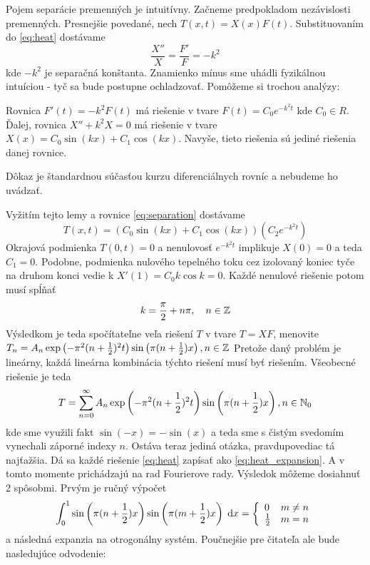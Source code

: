 Pojem separácie premenných je intuitívny. Začneme predpokladom
nezávislosti premenných. Presnejšie povedané, nech
$T(x,t) = X(x) F(t)$. Substituovaním do \ref{eq:heat}
dostávame
\begin{equation}
    \frac{X''}{X} = \frac{F'}{F} = - k^2
    \label{eq:separation}
\end{equation}
kde $-k^2$ je separačná konštanta. Znamienko mínus sme uhádli
fyzikálnou intuíciou - tyč sa bude postupne ochladzovať.
Pomôžeme si trochou analýzy:
\begin{lema}
    Rovnica $F'(t) = -k^2 F(t)$ má riešenie v tvare 
    $F(t) = C_0 e^{-k^2 t}$ kde $C_0 \in R$.
    Ďalej, rovnica $X'' + k^2 X = 0$ má riešenie v tvare
    $X(x) = C_0 \sin(k x) + C_1 \cos(k x)$. Navyše, tieto riešenia sú
    jediné riešenia danej rovnice.
\end{lema}
\begin{dokaz}
    Dôkaz je štandardnou súčasťou kurzu diferenciálnych rovníc a
    nebudeme ho uvádzať.
\end{dokaz}
Vyžitím tejto lemy a rovnice \ref{eq:separation} dostávame
\begin{equation}
    T(x,t) = (C_0 \sin (k x) + C_1 \cos (k x))(C_2 e^{-k^2 t})
\end{equation}
Okrajová podmienka $T(0,t) = 0$ a nenulovosť $e^{-k^2 t}$ 
implikuje $X(0)=0$ a teda $C_1 = 0$.
Podobne, podmienka nulového tepelného toku cez izolovaný koniec tyče
na druhom konci vedie k
$X'(1) = C_0 k \cos k = 0$. Každé nenulové riešenie potom musí spĺňať
\begin{equation}
    k = \frac{\pi}{2} + n \pi, \quad n \in \mathbb{Z}
\end{equation}
Výsledkom je teda spočítateľne veľa riešení $T$ v tvare $T=XF$,
menovite
$T_n = A_n \exp\left(-\pi^2 (n+\frac{1}{2})^2 t \right)
            \sin \left( \pi (n + \frac{1}{2}) x \right), n\in \mathbb{Z}$
Pretože daný problém je lineárny, každá lineárna kombinácia týchto
riešení musí byť riešením. Všeobecné riešenie je teda
\begin{equation}
T = \sum_{n=0}^{\infty} A_n \exp\left(-\pi^2 (n+\frac{1}{2})^2 t \right)
            \sin \left( \pi (n + \frac{1}{2}) x \right), n\in \mathbb{N}_0
    \label{eq:heat_expansion}
\end{equation}
kde sme využili fakt $\sin(-x) = -\sin(x)$ a teda sme s čistým
svedomím vynechali záporné indexy $n$.
Ostáva teraz jediná otázka, pravdupovediac tá najťažšia. Dá sa každé
riešenie \ref{eq:heat} zapísať ako \ref{eq:heat_expansion}. A v tomto
momente prichádzajú na rad Fourierove rady. Výsledok môžeme dosiahnuť
2 spôsobmi. Prvým je ručný výpočet
\begin{equation}
    \int_0^1 \sin\left(\pi(n+\frac{1}{2})x\right)
             \sin\left(\pi(m+\frac{1}{2})x\right) \; \mathrm{d} x =
    \left\{
    \begin{array}{l l}
        0& m\not=n \\
        \frac{1}{2} & m=n
    \end{array}
    \right.
\end{equation}
a následná expanzia na otrogonálny systém. Poučnejšie pre čitateľa ale
bude nasledujúce odvodenie:
